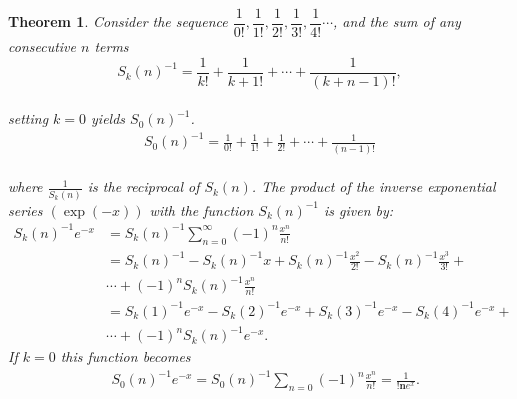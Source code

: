\documentclass[pdflatex,sn-mathphys-num]{sn-jnl}%
\newtheorem{theorem}{Theorem}
\theoremstyle{thmstyleone}%
\theoremstyle{thmstyletwo}%
\theoremstyle{thmstylethree}%
\begin{document}
\begin{theorem}\label{recip}
    Consider the sequence $\dfrac{1}{0!},\dfrac{1}{1!} ,\dfrac{1}{2!} , \dfrac{1}{3!}, \dfrac{1}{4!}\cdots$, and the sum of any consecutive $n$ terms $$S_k(n)^{-1}= \frac{1}{k!}+\frac{1}{k+1!}+ \cdots+\frac{1}{(k+n-1)!},$$\\
    setting $k=0$ yields \cite{euler1862opera} $ S_0(n)^{-1}$. 
    \begin{align*}
    S_0(n)^{-1}= \frac{1}{0!}+\frac{1}{1!}+\frac{1}{2!} +\cdots+\frac{1}{(n-1)!}
     \end{align*}
    \\where $\frac{1}{S_k(n)}$ is the reciprocal of $S_k(n)$.
 The product of the inverse exponential series $(\exp{(-x)})$ with the function $S_k(n)^{-1}$ is given by:
\begin{align}
S_k(n)^{-1}e^{-x} &= S_k(n)^{-1}\sum_{n=0}^{\infty}(-1)^n\frac{x^n}{n!}\\
& = S_k(n)^{-1} -S_k(n)^{-1}x + S_k(n)^{-1}\frac{x^2}{2!}- S_k(n)^{-1}\frac{x^3}{3!}+\\ \nonumber
&\cdots + (-1)^nS_k(n)^{-1}\frac{x^n}{n!}\\
& = S_k(1)^{-1}e^{-x} - S_k(2)^{-1}e^{-x} + S_k(3)^{-1}e^{-x}- S_k(4)^{-1}e^{-x}+\\
&\cdots +(-1)^nS_k(n)^{-1}e^{-x}.
\end{align}
If $k=0$ this function becomes 
\begin{align*}
&S_0(n)^{-1}e^{-x} = S_0(n)^{-1}\sum_{n=0}(-1)^n\frac{x^n}{n!}
=\frac{1}{\mathbf{!n}e^x}.
\end{align*}
\end{theorem}
\end{document}
